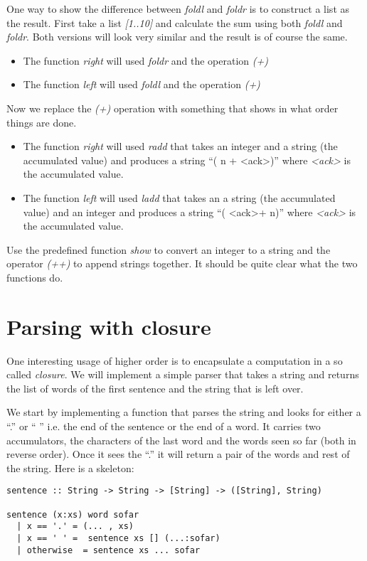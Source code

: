 \documentclass[a4paper,11pt]{article}
\newcommand{\nnsection}[1]{
\section*{#1}
\addcontentsline{toc}{section}{#1}
}
\begin{document}
One way to show the difference between {\em foldl} and {\em foldr} is
to construct a list as the result. First take a list {\em [1..10]} and
calculate the sum using both {\em foldl} and {\em foldr}. Both
versions will look very similar and the result is of course the same.

\begin{itemize}
\item The function {\em right} will used {\em foldr} and the operation {\em (+)}
\item The function {\em left} will used {\em foldl} and the operation {\em (+)}
\end{itemize}

Now we replace the {\em (+)} operation with something that shows in
what order things are done.

\begin{itemize}
\item The function {\em right} will used {\em radd} that takes an
  integer and a string (the accumulated value) and produces a string
  ``( n + \textless ack\textgreater )'' where {\em \textless ack\textgreater} is the accumulated value.
\item The function {\em left} will used {\em ladd} that takes an
a string (the accumulated value) and an integer and produces a string
  ``( \textless ack\textgreater + n)'' where {\em \textless ack\textgreater} is the accumulated value.
\end{itemize}

Use the predefined function {\em show} to convert an integer to a
string and the operator {\em (++)} to append strings together. It
should be quite clear what the two functions do.

\nnsection{Parsing with closure} 

One interesting usage of higher order is to encapsulate a computation
in a so called {\em closure}. We will implement a simple parser that
takes a string and returns the list of words of the first sentence and
the string that is left over. 

We start by implementing a function that parses the string and looks
for either a ``.'' or `` '' i.e. the end of the sentence or the end of
a word. It carries two accumulators, the characters of the last word
and the words seen so far (both in reverse order). Once it sees the
``.'' it will return a pair of the words and rest of the string. Here
is a skeleton:

\begin{verbatim}
sentence :: String -> String -> [String] -> ([String], String)

sentence (x:xs) word sofar 
  | x == '.' = (... , xs)
  | x == ' ' =  sentence xs [] (...:sofar)
  | otherwise  = sentence xs ... sofar
\end{verbatim}
\end{document}
